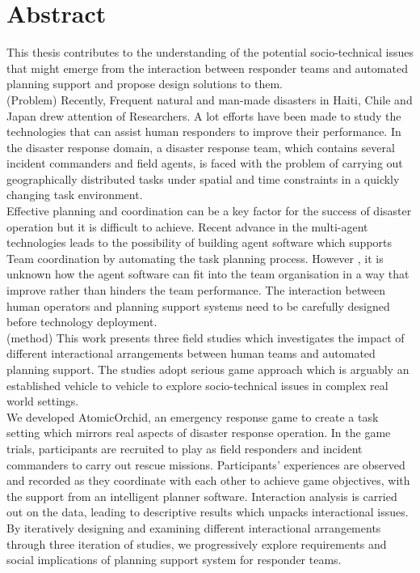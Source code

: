 \begingroup
\let\clearpage\relax
\let\cleardoublepage\relax
\let\cleardoublepage\relax

\chapter*{Abstract}
\noindent This thesis contributes to the understanding of the potential socio-technical issues that might emerge from the interaction between responder teams and automated planning support and propose design solutions to them. \\

(Problem) Recently, Frequent natural and man-made disasters in Haiti, Chile and Japan drew attention of Researchers. A lot efforts have been made to study the technologies that can assist human responders to improve their performance. In the disaster response domain,  a disaster response team, which contains several incident commanders and field agents, is faced with the problem of carrying out geographically distributed tasks under spatial and time constraints in a quickly changing task environment. \\ 

\noindent Effective planning and coordination can be a key factor for the success of disaster operation but it is difficult to achieve. Recent advance in the multi-agent technologies leads to the possibility of building agent software which supports Team coordination by automating the task planning process. However , it is unknown how the agent software can fit into the team organisation in a way that improve rather than hinders the team performance. The interaction between human operators and planning support systems need to be carefully designed before technology deployment.\\

\noindent (method) This work presents three field studies which investigates the impact of different interactional arrangements between human teams and automated planning support. The studies adopt serious game approach which is arguably an established vehicle to vehicle to explore socio-technical issues in complex real world settings.\\

\noindent  We developed AtomicOrchid, an emergency response game to create a task setting which mirrors real aspects of disaster response operation. In the game trials, participants are recruited to play as field responders and incident commanders to carry out rescue missions. Participants' experiences are observed and recorded as they coordinate with each other to achieve game objectives, with the support from an intelligent planner software. Interaction analysis is carried out on the data, leading to descriptive results which unpacks interactional issues. By iteratively designing and examining different interactional arrangements through three iteration of studies, we progressively explore requirements and social implications of planning support system for responder teams.\\

